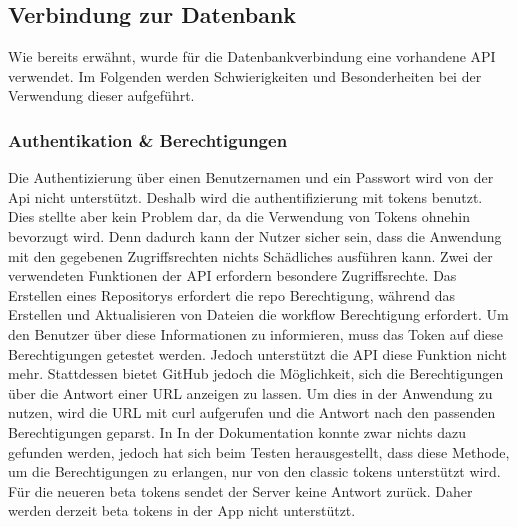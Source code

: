 \subsection{Verbindung zur Datenbank} %
Wie bereits erwähnt, wurde für die Datenbankverbindung eine vorhandene API verwendet. Im Folgenden werden Schwierigkeiten und Besonderheiten bei der Verwendung dieser aufgeführt.
%
%
%
%
%
%
%
\subsubsection{Authentikation \& Berechtigungen}%
%
Die Authentizierung über einen Benutzernamen und ein Passwort wird von der Api nicht unterstützt\cite{imp_github_userPasswordAuthentication}. Deshalb wird die authentifizierung mit tokens benutzt. %
Dies stellte aber kein Problem dar, da die Verwendung von Tokens ohnehin bevorzugt wird. Denn dadurch kann der Nutzer sicher sein, dass die Anwendung mit den gegebenen Zugriffsrechten nichts Schädliches ausführen kann.%
%
\newline%
Zwei der verwendeten Funktionen der API erfordern besondere Zugriffsrechte. Das Erstellen eines Repositorys erfordert die \glqq repo\grqq{} Berechtigung\cite{imp_github_createRepo}, während das Erstellen und Aktualisieren von Dateien die \glqq workflow\grqq{} Berechtigung erfordert\cite{imp_github_createFile}. Um den Benutzer über diese Informationen zu informieren, muss das Token auf diese Berechtigungen getestet werden. Jedoch unterstützt die API diese Funktion nicht mehr\cite{imp_github_tokensScopeDiscontinued}. Stattdessen bietet GitHub jedoch die Möglichkeit, sich die Berechtigungen über die Antwort einer URL anzeigen zu lassen\cite{imp_github_tokensScopeCurl}. Um dies in der Anwendung zu nutzen, wird die URL mit curl aufgerufen und die Antwort nach den passenden Berechtigungen geparst.%
\newline%
In In der Dokumentation konnte zwar nichts dazu gefunden werden, jedoch hat sich beim Testen herausgestellt, dass diese Methode, um die Berechtigungen zu erlangen, nur von den \glqq classic tokens\grqq{} unterstützt wird. Für die neueren \glqq beta tokens\grqq{} sendet der Server keine Antwort zurück. Daher werden derzeit \glqq beta tokens\grqq{} in der App nicht unterstützt.%
